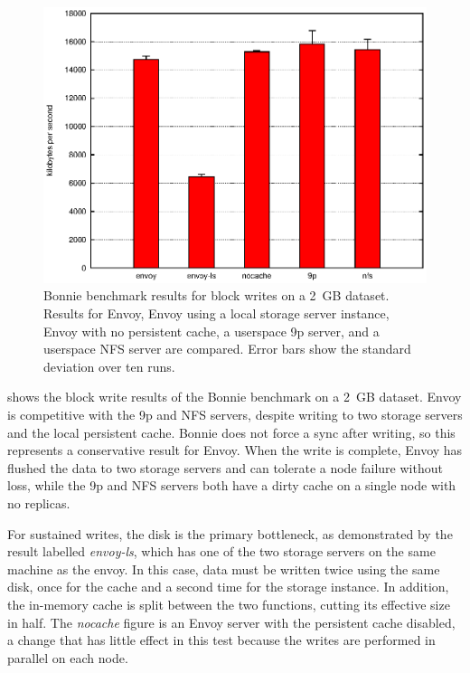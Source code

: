 \begin{figure}[t]
\centering
\includegraphics[width=\figwidth]{figures/bonnie-druid1-write}
\caption[Bonnie benchmark results for block writes]{Bonnie benchmark results for block writes on a 2~GB dataset. Results for Envoy, Envoy using a local storage server instance, Envoy with no persistent cache, a userspace 9p server, and a userspace NFS server are compared. Error bars show the standard deviation over ten runs.}
\label{fig:bonnie-druid1-write}
\end{figure}

 shows the block write results of the Bonnie benchmark on a 2~GB dataset. Envoy is competitive with the 9p and NFS servers, despite writing to two storage servers and the local persistent cache. Bonnie does not force a sync after writing, so this represents a conservative result for Envoy. When the write is complete, Envoy has flushed the data to two storage servers and can tolerate a node failure without loss, while the 9p and NFS servers both have a dirty cache on a single node with no replicas.

For sustained writes, the disk is the primary bottleneck, as demonstrated by the result labelled \emph{envoy-ls}, which has one of the two storage servers on the same machine as the envoy. In this case, data must be written twice using the same disk, once for the cache and a second time for the storage instance. In addition, the in-memory cache is split between the two functions, cutting its effective size in half. The \emph{nocache} figure is an Envoy server with the persistent cache disabled, a change that has little effect in this test because the writes are performed in parallel on each node.

